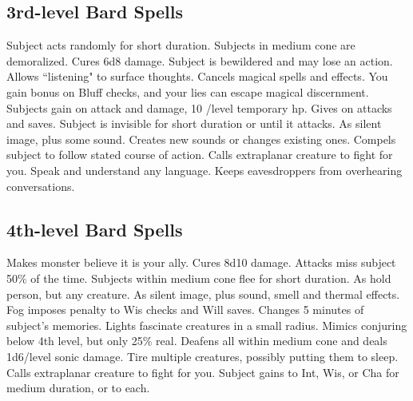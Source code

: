 \subsection{3rd-level Bard Spells}
\begin{spelllist}
   Subject acts randomly for short duration.
   Subjects in medium cone are demoralized.
   Cures 6d8 damage.
   Subject is bewildered and may lose an action.
   Allows ``listening" to surface thoughts.
   Cancels magical spells and effects.
   You gain  bonus on Bluff checks, and your lies can escape magical discernment.
   Subjects gain  on attack and damage, 10 /level temporary hp.
   Gives  on attacks and saves.
   Subject is invisible for short duration or until it attacks.
   As silent image, plus some sound.
   Creates new sounds or changes existing ones.
   Compels subject to follow stated course of action.
   Calls extraplanar creature to fight for you.
   Speak and understand any language.
   Keeps eavesdroppers from overhearing conversations.
\end{spelllist}

\subsection{4th-level Bard Spells}
\begin{spelllist} 
   Makes monster believe it is your ally.
   Cures 8d10 damage.
   Attacks miss subject 50\% of the time.
   Subjects within medium cone flee for short duration.
   As hold person, but any creature.
   As silent image, plus sound, smell and thermal effects.
   Fog imposes  penalty to Wis checks and Will saves.
   Changes 5 minutes of subject's memories.
   Lights fascinate creatures in a small radius.
   Mimics conjuring below 4th level, but only 25\% real.
   Deafens all within medium cone and deals 1d6/level sonic damage.
   Tire multiple creatures, possibly putting them to sleep.
   Calls extraplanar creature to fight for you.
   Subject gains  to Int, Wis, or Cha for medium duration, or  to each.%
\end{spelllist}

